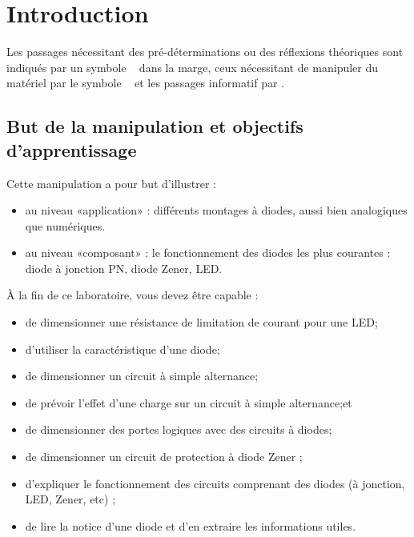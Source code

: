 \documentclass{../template/labo}
\author{The Fantastic Four}
\begin{document}

\section{Introduction}

Les passages nécessitant des pré-déterminations ou des réflexions théoriques sont indiqués par un symbole \faCogs~ dans la marge,
ceux nécessitant de manipuler du matériel par le symbole \faFlask~ et les passages informatif par \faLightbulbO.


\subsection{But de la manipulation et objectifs d'apprentissage}
Cette manipulation a pour but d'illustrer :
\begin{itemize}
\item au niveau «application» : différents montages à diodes, aussi bien analogiques que numériques. 
\item au niveau «composant» : le fonctionnement des diodes les plus courantes : diode à jonction PN, diode Zener, LED.
\end{itemize}

À la fin de ce laboratoire, vous devez être capable :
\begin{itemize}
\item de dimensionner une résistance de limitation de courant pour une LED; 
\item d'utiliser la caractéristique d'une diode;
\item de dimensionner un circuit à simple alternance; 
\item de prévoir l'effet d'une charge sur un circuit à simple alternance;et 
\item de dimensionner des portes logiques avec des circuits à diodes; 
\item de dimensionner un circuit de protection à diode Zener ;
\item d'expliquer le fonctionnement des circuits comprenant des diodes (à jonction, LED, Zener, etc) ;
\item de lire la notice d'une diode et d'en extraire les informations utiles. 
\end{itemize}
\end{document}
